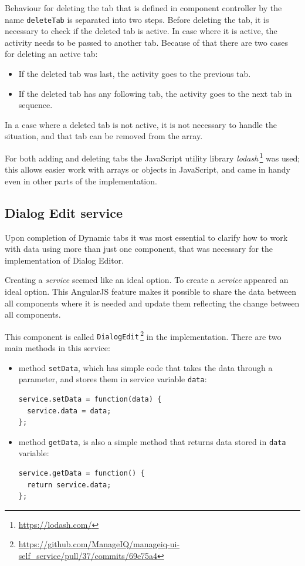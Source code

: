 Behaviour for deleting the tab that is defined in component controller by the
name {\tt deleteTab} is separated into two steps.
Before deleting the tab, it is necessary to check if the deleted tab is
active.
In case where it is active, the activity needs to be passed to another
tab. Because of that there are two cases for deleting an active tab:

\begin{itemize}
  \item If the deleted tab was last, the activity goes to the previous tab.
  \item If the deleted tab has any following tab, the activity goes to the next
        tab in sequence.
\end{itemize}

In a case where a deleted tab is not active, it is not necessary to handle the
situation, and that tab can be removed from the array.

For both adding and deleting tabs the JavaScript utility library
{\it lodash}\,\footnote{\url{https://lodash.com/}} was used; this allows easier
work with arrays or objects in JavaScript, and came in handy even in other
parts of the implementation.

\subsection{Dialog Edit service}

Upon completion of Dynamic tabs it was most essential to clarify how to
work with data using more than just one component, that was necessary for
the implementation of Dialog Editor.

Creating a {\it service} seemed like an ideal option.
To create a {\it service} appeared an ideal option. This AngularJS
feature makes it possible to share the data between all components where it is
needed and update them reflecting the change between all components.

This component is called {\tt DialogEdit}\,\footnote{\url{https://github.com/ManageIQ/manageiq-ui-self_service/pull/37/commits/69e75a4}} in the implementation.
There are two main methods in this service:

\begin{itemize}
  \item method {\tt setData}, which has simple code that takes the data through
        a parameter, and stores them in service variable {\tt data}:
        \begin{lstlisting}
service.setData = function(data) {
  service.data = data;
};
        \end{lstlisting}
  \item method {\tt getData}, is also a simple method that returns data stored
        in {\tt data} variable:
        \begin{lstlisting}
service.getData = function() {
  return service.data;
};
        \end{lstlisting}
\end{itemize}

